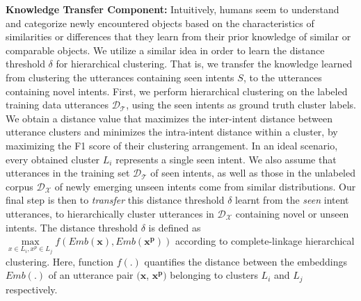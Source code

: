 \noindent \textbf{Knowledge Transfer Component: }
Intuitively, humans seem to understand and categorize newly encountered objects based on the characteristics of similarities or differences that they learn from their prior knowledge of similar or comparable objects. We utilize a similar idea in order to learn the distance threshold $\delta$ for hierarchical clustering. That is, we transfer the knowledge learned from clustering the utterances containing seen intents $S$, to the utterances containing novel intents.
First, we perform hierarchical clustering on the labeled training data utterances $\mathcal{D_T}$, using the seen intents as ground truth cluster labels. %
We obtain a distance value that maximizes the inter-intent distance between utterance clusters and minimizes the intra-intent distance within a cluster, by maximizing the F1 score of their clustering arrangement. 
In an ideal scenario, every obtained cluster $L_i$ represents a single seen intent. We also assume that utterances in the training set $\mathcal{D_T}$ of seen intents, as well as those in the unlabeled corpus $\mathcal{D_X}$ of newly emerging unseen intents come from similar distributions. %
Our final step is then to \textit{transfer} this distance threshold $\delta$ learnt from the \textit{seen} intent utterances, to hierarchically cluster utterances in $\mathcal{D_X}$ containing novel or unseen intents. The distance threshold $\delta$ is defined as $\max\limits_{x \in L_i, x^p \in L_j} f(Emb(\bm{x}), Emb(\bm{x^p}))$ according to complete-linkage hierarchical clustering. Here, function $f(.)$ quantifies the distance between the embeddings $Emb(.)$ of an utterance pair $(\bm{x}$, $\bm{x^p})$ belonging to clusters $L_i$ and $L_j$ respectively.  %


